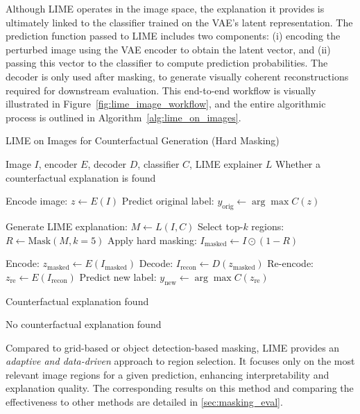 Although LIME operates in the image space, the explanation it provides is ultimately linked to the classifier trained on the VAE’s latent representation. The prediction function passed to LIME includes two components: (i) encoding the perturbed image using the VAE encoder to obtain the latent vector, and (ii) passing this vector to the classifier to compute prediction probabilities. The decoder is only used after masking, to generate visually coherent reconstructions required for downstream evaluation. This end-to-end workflow is visually illustrated in Figure~\ref{fig:lime_image_workflow}, and the entire algorithmic process is outlined in Algorithm~\ref{alg:lime_on_images}.



\begin{algorithm}[ht]
\caption{LIME on Images for Counterfactual Generation (Hard Masking)}
\label{alg:lime_on_images}
\begin{algorithmic}[1]
\REQUIRE Image $I$, encoder $E$, decoder $D$, classifier $C$, LIME explainer $L$
\ENSURE Whether a counterfactual explanation is found

\STATE Encode image: $z \leftarrow E(I)$
\STATE Predict original label: $y_{\text{orig}} \leftarrow \arg\max C(z)$

\STATE Generate LIME explanation: $M \leftarrow L(I, C)$
\STATE Select top-$k$ regions: $R \leftarrow \text{Mask}(M, k=5)$
\STATE Apply hard masking: $I_{\text{masked}} \leftarrow I \odot (1 - R)$

\STATE Encode: $z_{\text{masked}} \leftarrow E(I_{\text{masked}})$
\STATE Decode: $I_{\text{recon}} \leftarrow D(z_{\text{masked}})$
\STATE Re-encode: $z_{\text{re}} \leftarrow E(I_{\text{recon}})$
\STATE Predict new label: $y_{\text{new}} \leftarrow \arg\max C(z_{\text{re}})$

    \RETURN Counterfactual explanation found
\ENDIF

\RETURN No counterfactual explanation found
\end{algorithmic}
\end{algorithm}

Compared to grid-based or object detection-based masking, LIME provides an \emph{adaptive and data-driven} approach to region selection. It focuses only on the most relevant image regions for a given prediction, enhancing interpretability and explanation quality. The corresponding results on this method and comparing the effectiveness to other methods are detailed in \cref{sec:masking_eval}.






